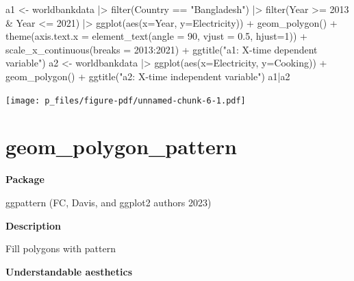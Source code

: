 \documentclass[
  letterpaper,
  DIV=11,
  numbers=noendperiod]{scrreprt}
\newenvironment{Shaded}{\begin{snugshade}}{\end{snugshade}}
\newcommand{\AttributeTok}[1]{\textcolor[rgb]{0.40,0.45,0.13}{#1}}
\newcommand{\DecValTok}[1]{\textcolor[rgb]{0.68,0.00,0.00}{#1}}
\newcommand{\FloatTok}[1]{\textcolor[rgb]{0.68,0.00,0.00}{#1}}
\newcommand{\FunctionTok}[1]{\textcolor[rgb]{0.28,0.35,0.67}{#1}}
\newcommand{\NormalTok}[1]{\textcolor[rgb]{0.00,0.23,0.31}{#1}}
\newcommand{\OtherTok}[1]{\textcolor[rgb]{0.00,0.23,0.31}{#1}}
\newcommand{\SpecialCharTok}[1]{\textcolor[rgb]{0.37,0.37,0.37}{#1}}
\newcommand{\StringTok}[1]{\textcolor[rgb]{0.13,0.47,0.30}{#1}}
\begin{document}
\begin{Shaded}
\begin{Highlighting}[]
\NormalTok{a1 }\OtherTok{\textless{}{-}}\NormalTok{ worldbankdata }\SpecialCharTok{|\textgreater{}}
  \FunctionTok{filter}\NormalTok{(Country }\SpecialCharTok{==} \StringTok{"Bangladesh"}\NormalTok{) }\SpecialCharTok{|\textgreater{}} 
  \FunctionTok{filter}\NormalTok{(Year }\SpecialCharTok{\textgreater{}=} \DecValTok{2013} \SpecialCharTok{\&}\NormalTok{ Year }\SpecialCharTok{\textless{}=} \DecValTok{2021}\NormalTok{) }\SpecialCharTok{|\textgreater{}}
  \FunctionTok{ggplot}\NormalTok{(}\FunctionTok{aes}\NormalTok{(}\AttributeTok{x=}\NormalTok{Year, }\AttributeTok{y=}\NormalTok{Electricity)) }\SpecialCharTok{+} 
  \FunctionTok{geom\_polygon}\NormalTok{() }\SpecialCharTok{+}
  \FunctionTok{theme}\NormalTok{(}\AttributeTok{axis.text.x =} \FunctionTok{element\_text}\NormalTok{(}\AttributeTok{angle =} \DecValTok{90}\NormalTok{, }\AttributeTok{vjust =} \FloatTok{0.5}\NormalTok{, }\AttributeTok{hjust=}\DecValTok{1}\NormalTok{)) }\SpecialCharTok{+} 
  \FunctionTok{scale\_x\_continuous}\NormalTok{(}\AttributeTok{breaks =} \DecValTok{2013}\SpecialCharTok{:}\DecValTok{2021}\NormalTok{)  }\SpecialCharTok{+} 
  \FunctionTok{ggtitle}\NormalTok{(}\StringTok{"a1: X{-}time dependent variable"}\NormalTok{)}
\NormalTok{a2 }\OtherTok{\textless{}{-}}\NormalTok{ worldbankdata }\SpecialCharTok{|\textgreater{}}
  \FunctionTok{ggplot}\NormalTok{(}\FunctionTok{aes}\NormalTok{(}\AttributeTok{x=}\NormalTok{Electricity, }\AttributeTok{y=}\NormalTok{Cooking)) }\SpecialCharTok{+} 
  \FunctionTok{geom\_polygon}\NormalTok{() }\SpecialCharTok{+} \FunctionTok{ggtitle}\NormalTok{(}\StringTok{"a2: X{-}time independent variable"}\NormalTok{)}
\NormalTok{a1}\SpecialCharTok{|}\NormalTok{a2}
\end{Highlighting}
\end{Shaded}

\texttt{[image: p\_files/figure-pdf/unnamed-chunk-6-1.pdf]}

\section{geom\_polygon\_pattern}\label{geom_polygon_pattern}

\textbf{Package}

ggpattern (FC, Davis, and ggplot2 authors 2023)

\textbf{Description}

Fill polygons with pattern

\textbf{Understandable aesthetics}
\end{document}

